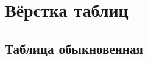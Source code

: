 \chapter{Вёрстка таблиц}\label{ch:ch3}

\section{Таблица обыкновенная}\label{sec:ch3/sect1}


\clearpage
